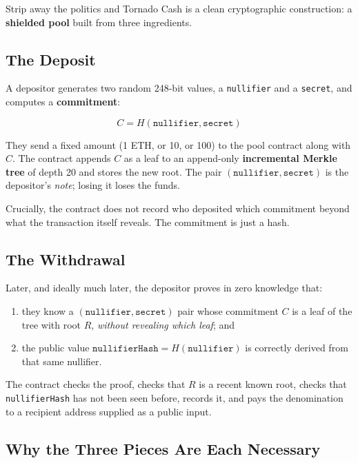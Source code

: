 Strip away the politics and Tornado Cash is a clean cryptographic construction:
a \textbf{shielded pool} built from three ingredients.

\subsection*{The Deposit}

A depositor generates two random 248-bit values, a \texttt{nullifier} and a
\texttt{secret}, and computes a \textbf{commitment}:

\[
  C = H(\texttt{nullifier}, \texttt{secret})
\]

They send a fixed amount (1 ETH, or 10, or 100) to the pool contract along
with $C$. The contract appends $C$ as a leaf to an append-only
\textbf{incremental Merkle tree} of depth 20 and stores the new root. The pair
$(\texttt{nullifier}, \texttt{secret})$ is the depositor's \emph{note}; losing it
loses the funds.

Crucially, the contract does not record who deposited which commitment beyond
what the transaction itself reveals. The commitment is just a hash.

\subsection*{The Withdrawal}

Later, and ideally much later, the depositor proves in zero knowledge that:

\begin{enumerate}
  \item they know a $(\texttt{nullifier}, \texttt{secret})$ pair whose
        commitment $C$ is a leaf of the tree with root $R$, \emph{without
        revealing which leaf}; and
  \item the public value $\texttt{nullifierHash} = H(\texttt{nullifier})$
        is correctly derived from that same nullifier.
\end{enumerate}

The contract checks the proof, checks that $R$ is a recent known root, checks
that \texttt{nullifierHash} has not been seen before, records it, and pays the
denomination to a recipient address supplied as a public input.

\subsection*{Why the Three Pieces Are Each Necessary}

